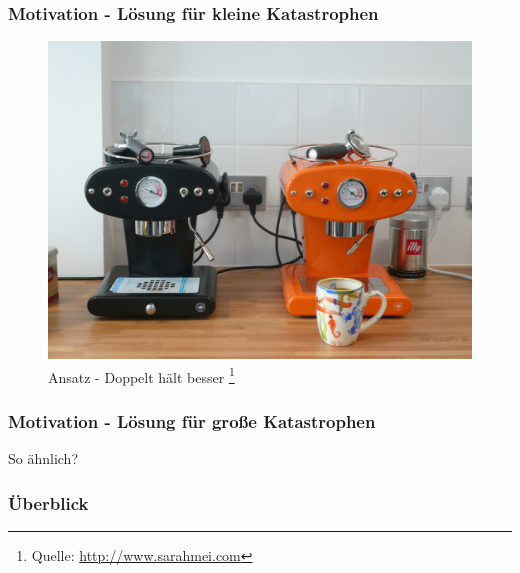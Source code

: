 %
%
%
\begin{frame}
	\frametitle{Motivation - Lösung für kleine Katastrophen}
	\begin{figure}
		\includegraphics[scale=0.2]{grafiken/working}		
		\caption{Ansatz - Doppelt hält besser
			\footnote{\tiny Quelle: \url{http://www.sarahmei.com} }
		}		
	\end{figure}
\end{frame}
%
%
%
\begin{frame}
	\frametitle{Motivation - Lösung für große Katastrophen}

	\begin{center}
		{\huge So ähnlich?}
	\end{center}
\end{frame}
%
%
%
\begin{frame}
	\frametitle{Überblick}
	\tableofcontents[currentsubsection]
\end{frame}
%
%
